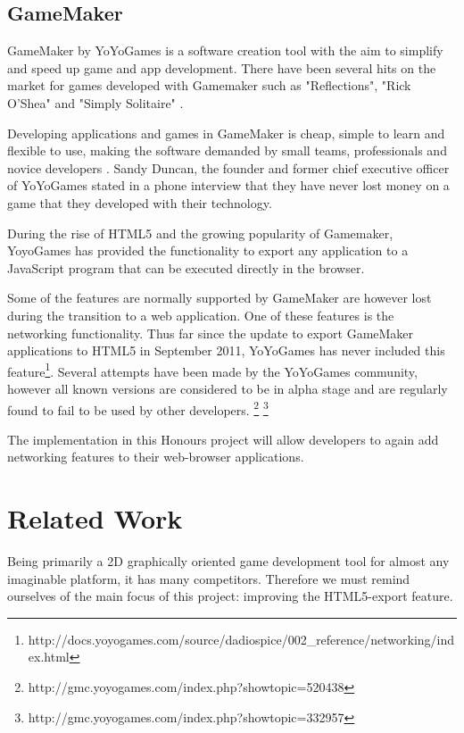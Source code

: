 \documentclass[bsc,frontabs,twoside,singlespacing,parskip,deptreport]{infthesis}     %
\begin{document}
\subsection{GameMaker}
GameMaker by YoYoGames is a software creation tool with the aim to simplify and speed up game and app development. There have been several hits on the market for games developed with Gamemaker such as "Reflections", "Rick O'Shea" and "Simply Solitaire" \cite{Gamemaker_DnD}.

Developing applications and games in GameMaker is cheap, simple to learn and flexible to use, making the software demanded by small teams, professionals and novice developers \cite{Mark_Overmars}. Sandy Duncan, the founder and former chief executive officer of YoYoGames stated in a phone interview that they have never lost money on a game that they developed with their technology\cite{Gamemaker_DnD}.

During the rise of HTML5 and the growing popularity of Gamemaker, YoyoGames has provided the functionality to export any application to a JavaScript program that can be executed directly in the browser\cite{GameMaker_Studio}.

Some of the features are normally supported by GameMaker are however lost during the transition to a web application. One of these features is the networking functionality. Thus far since the update to export GameMaker applications to HTML5 in September 2011, YoYoGames has never included this feature\footnote{http://docs.yoyogames.com/source/dadiospice/002\_reference/networking/index.html}. Several attempts have been made by the YoYoGames community, however all known versions are considered to be in alpha stage and are regularly found to fail to be used by other developers.
\footnote{http://gmc.yoyogames.com/index.php?showtopic=520438}
\footnote{http://gmc.yoyogames.com/index.php?showtopic=332957}

The implementation in this Honours project will allow developers to again add networking features to their web-browser applications.

\section{Related Work}
Being primarily a 2D graphically oriented game development tool for almost any imaginable platform, it has many competitors. Therefore we must remind ourselves of the main focus of this project: improving the HTML5-export feature. 
\end{document}
